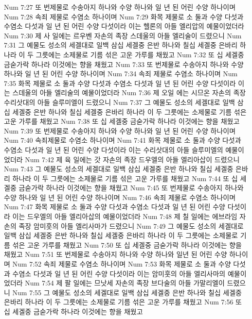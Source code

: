 Num 7:27  또 번제물로 수송아지 하나와 수양 하나와 일 년 된 어린 수양 하나이며
Num 7:28  속죄 제물로 수염소 하나이며
Num 7:29  화목 제물로 소 둘과 수양 다섯과 수염소 다섯과 일 년 된 어린 수양 다섯이라 이는 헬론의 아들 엘리압의 예물이었더라
Num 7:30  제 사 일에는 르우벤 자손의 족장 스데울의 아들 엘리술이 드렸으니
Num 7:31  그 예물도 성소의 세겔대로 일백 삼십 세겔중 은반 하나와 칠십 세겔중 은바리 하나라 이 두 그릇에는 소제물로 기름 섞은 고운 가루를 채웠고
Num 7:32  또 십 세겔중 금숟가락 하나라 이것에는 향을 채웠고
Num 7:33  또 번제물로 수송아지 하나와 수양 하나와 일 년 된 어린 수양 하나이며
Num 7:34  속죄 제물로 수염소 하나이며
Num 7:35  화목 제물로 소 둘과 수양 다섯과 수염소 다섯과 일 년 된 어린 수양 다섯이라 이는 스데울의 아들 엘리술의 예물이었더라
Num 7:36  제 오일 에는 시므온 자손의 족장 수리삿대의 아들 슬루미엘이 드렸으니
Num 7:37  그 예물도 성소의 세겔대로 일백 삼십 세겔중 은반 하나와 칠십 세겔중 은바리 하나라 이 두 그릇에는 소제물로 기름 섞은 고운 가루를 채웠고
Num 7:38  또 십 세겔중 금숟가락 하나라 이것에는 향을 채웠고
Num 7:39  또 번제물로 수송아지 하나와 수양 하나와 일 년 된 어린 수양 하나이며
Num 7:40  속죄제물로 수염소 하나이며
Num 7:41  화목 제물로 소 둘과 수양 다섯과 수염소 다섯과 일 년 된 어린 수양 다섯이라 이는 수리삿대의 아들 슬루미엘의 예물이었더라
Num 7:42  제 육 일에는 갓 자손의 족장 드우엘의 아들 엘리아삽이 드렸으니
Num 7:43  그 예물도 성소의 세겔대로 일백 삼십 세겔중 은반 하나와 칠십 세겔중 은바리 하나라 이 두 그릇에는 소제물로 기름 섞은 고운 가루를 채웠고
Num 7:44  또 십 세겔중 금숟가락 하나라 이것에는 향을 채웠고
Num 7:45  또 번제물로 수송아지 하나와 수양 하나와 일 년 된 어린 수양 하나이며
Num 7:46  속죄 제물로 수염소 하나이며
Num 7:47  화목 제물로 소 둘과 수양 다섯과 수염소 다섯과 일 년 된 어린 수양 다섯이라 이는 드우엘의 아들 엘리아삽의 예물이었더라
Num 7:48  제 칠 일에는 에브라임 자손의 족장 암미훗의 아들 엘리사마가 드렸으니
Num 7:49  그 예물도 성소의 세겔대로 일백 삼십 세겔중 은반 하나와 칠십 세겔중 은바리 하나라 이 두 그릇에는 소제물로 기름 섞은 고운 가루를 채웠고
Num 7:50  또 십 세겔중 금숟가락 하나라 이것에는 향을 채웠고
Num 7:51  또 번제물로 수송아지 하나와 수양 하나와 일년 된 어린 수양 하나이며
Num 7:52  속죄 제물로 수염소 하나이며
Num 7:53  화목 제물로 소 둘과 수양 다섯과 수염소 다섯과 일 년 된 어린 수양 다섯이라 이는 암미훗의 아들 엘리사마의 예물이었더라
Num 7:54  제 팔 일에는 므낫세 자손의 족장 브다술의 아들 가말리엘이 드렸으니
Num 7:55  그 예물도 성소의 세겔대로 일백 삼십 세겔중 은반 하나와 칠십 세겔중 은바리 하나라 이 두 그릇에는 소제물로 기름 섞은 고운 가루를 채웠고
Num 7:56  또 십 세겔중 금숟가락 하나라 이것에는 향을 채웠고

